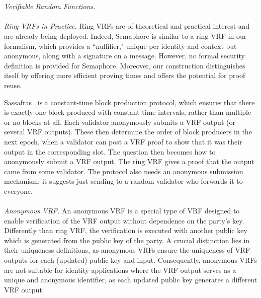 \\\\
\noindent\textit{Verifiable Random Functions.} 
\\\\
\noindent\textit{Ring VRFs in Practice.} 
Ring VRFs are of theoretical and practical interest and are already being deployed.
Indeed, Semaphore \cite{Semaphore} is similar to a ring VRF in our formalism, which provides a ``nullifier," unique per identity and context but anonymous, along with a signature on a message. However, no formal security definition is provided for Semaphore.  Moreover, our construction distinguishes itself by offering more efficient proving times and offers the potential for proof reuse.

Sassafras~\cite{Sassafras} is a constant-time block production protocol, which ensures that there is exactly one block produced with constant-time intervals, rather than multiple or no blocks at all.
Each validator anonymously submits a VRF output (or several VRF outputs). These then determine the order of block producers in the next epoch, when a validator can post a VRF proof to show that it was their output in the corresponding slot. The question then becomes how to anonymously submit a VRF output. The ring VRF gives a proof that the output came from some validator. The protocol also needs an anonymous submission mechanism: it suggests just sending to a random validator who forwards it to everyone.
\\\\
\noindent\textit{Anonymous VRF.}  An anonymous VRF \cite{anonymousVRF} is a special type of VRF designed to enable verification of the VRF output without dependence on the party's key.  Differently than ring VRF, the verification is executed with another public key which is generated from the public key of the party.  A crucial distinction lies in their  uniqueness definitions, as anonymous VRFs ensure the uniqueness of VRF outputs for each (updated) public key and input. Consequently, anonymous VRFs are not suitable for identity applications where the VRF output serves as a unique and anonymous identifier, as each updated public key generates a different VRF output.
